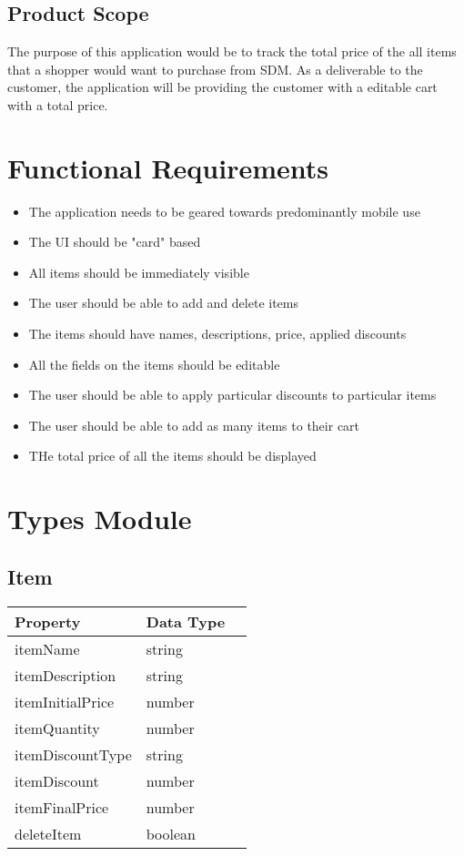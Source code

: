 \documentclass[12pt]{article}
\begin{document}
\subsection{Product Scope}
The purpose of this application would be to track the total price of the all items that a
shopper would want to purchase from SDM. As a deliverable to the customer, the application will be 
providing the customer with a editable cart with a total price.


\newpage
\section{Functional Requirements}
\begin{itemize}
  \item The application needs to be geared towards predominantly mobile use
  \item The UI should be "card" based
  \item All items should be immediately visible
  \item The user should be able to add and delete items
  \item The items should have names, descriptions, price, applied discounts
  \item All the fields on the items should be editable
  \item The user should be able to apply particular discounts to particular items
  \item The user should be able to add as many items to their cart
  \item THe total price of all the items should be displayed

\end{itemize}

\newpage
\section*{Types Module}

\subsection{Item}
\begin{tabular}{| l | l | p{6cm} |}
  \hline
  \textbf{Property} & \textbf{Data Type}\\
  \hline
  itemName & string\\
  \hline
  itemDescription & string\\
  \hline
  itemInitialPrice & number\\
  \hline
  itemQuantity & number\\
  \hline
  itemDiscountType & string\\
  \hline
  itemDiscount & number\\
  \hline
  itemFinalPrice & number\\
  \hline
  deleteItem & boolean\\
  \hline
  \end{tabular}
\end{document}
